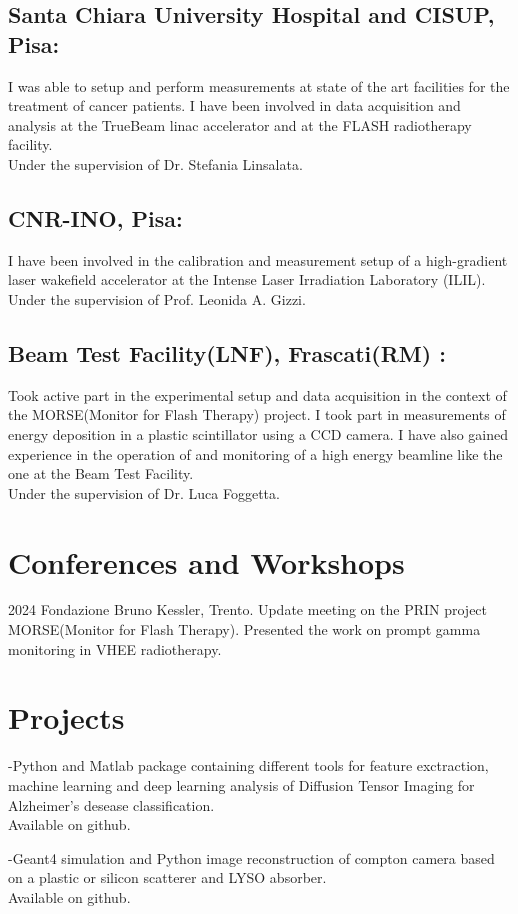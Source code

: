 \documentclass[11pt,letterpaper]{report}
\newcommand{\listitemspace}{0.25em}
\renewenvironment{itemize}
{\begin{list}{}{\setlength{\leftmargin}{0em}
                \setlength{\parskip}{0em}
                \setlength{\itemsep}{\listitemspace}
                \setlength{\parsep}{\listitemspace}}}
{\end{list}}
\begin{document}
    \subsection*{Santa Chiara University Hospital and CISUP, Pisa:}
    I was able to setup and perform measurements at state of the art facilities
    for the treatment of cancer patients. I have been involved in data 
    acquisition and analysis at the TrueBeam linac accelerator and at the
    FLASH radiotherapy facility.\\ Under the supervision of Dr. Stefania Linsalata.
    \subsection*{CNR-INO, Pisa:} I have been involved in the calibration 
    and measurement setup of a high-gradient laser wakefield accelerator at the Intense Laser Irradiation Laboratory (ILIL).
    \\Under the supervision of Prof. Leonida A. Gizzi.
    \subsection*{Beam Test Facility(LNF), Frascati(RM) :}Took active part
    in the experimental setup and data acquisition in the context of the MORSE(Monitor for Flash Therapy)
    project. I took part in measurements of energy deposition in a plastic scintillator
    using a CCD camera. I have also gained experience in the operation of and monitoring
    of a high energy beamline like the one at the Beam Test Facility.
    \\Under the supervision of Dr. Luca Foggetta.

    \section*{Conferences and Workshops}
    \begin{tablist}
        \item[2024] \tab{}Fondazione Bruno Kessler, Trento. Update meeting on the PRIN 
        project MORSE(Monitor for Flash Therapy). Presented the work on prompt gamma 
        monitoring in VHEE radiotherapy.

    \end{tablist}


    \section*{Projects}
    \begin{itemize}
        \item -Python and Matlab package containing different tools for feature exctraction, machine learning and deep learning analysis of Diffusion Tensor Imaging for Alzheimer's desease classification. 
         \\Available on github.
        \item -Geant4 simulation and Python image reconstruction of compton camera based on a plastic or silicon 
        scatterer and LYSO absorber. \\Available on github.    
    \end{itemize}
\end{document}
